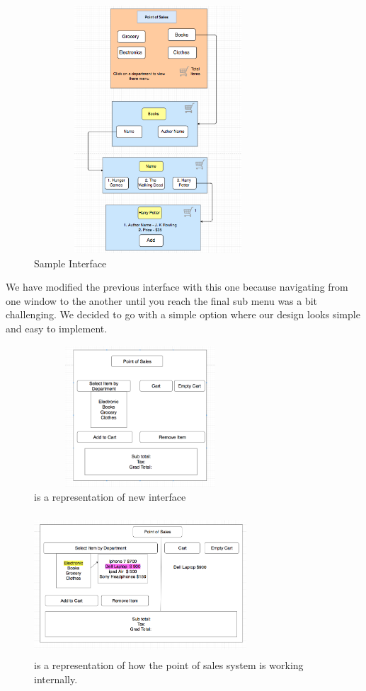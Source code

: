 \documentclass[10pt,conference,onecolumn,compsoc]{IEEEtran}
\begin{document}
\begin{figure}[H]
\includegraphics[height=350px, width=350px]{interface1}
\caption{Sample Interface}
\label{cat1}
\end{figure}


We have modified the previous interface with this one because navigating from one window to the another until you reach the final sub menu was a bit challenging. We decided to go with a simple option where our design looks simple and easy to implement.
\begin{figure}[H]
\includegraphics[height=200px, width=300px]{main}
\caption{is a representation of new interface}
\label{newmain}
\end{figure}

\begin{figure}[H]
\includegraphics[height=200px, width=300px]{submenu}
\caption{ is a representation of how the point of sales system is working internally.}
\label{newmain}
\end{figure}
\end{document}
